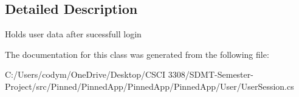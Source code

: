 \subsection{Detailed Description}
Holds user data after sucessfull login 



The documentation for this class was generated from the following file\+:\begin{DoxyCompactItemize}
\item 
C\+:/\+Users/codym/\+One\+Drive/\+Desktop/\+C\+S\+C\+I 3308/\+S\+D\+M\+T-\/\+Semester-\/\+Project/src/\+Pinned/\+Pinned\+App/\+Pinned\+App/\+Pinned\+App/\+User/User\+Session.\+cs\end{DoxyCompactItemize}
